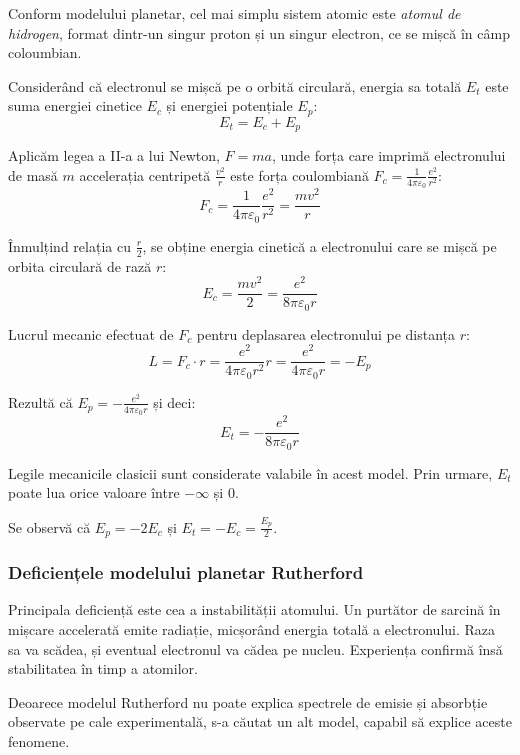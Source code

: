 Conform modelului planetar, cel mai simplu sistem atomic este
\emph{atomul de hidrogen}, format dintr-un singur proton și un singur electron,
ce se mișcă în câmp coloumbian.

Considerând că electronul se mișcă pe o orbită circulară, energia sa totală
$E_t$ este suma energiei cinetice $E_c$ și energiei potențiale $E_p$:
\[ E_t = E_c + E_p \]

Aplicăm legea a II-a a lui Newton, \( F = ma \), unde forța care imprimă
electronului de masă $m$ accelerația centripetă \( \frac{v^2}{r} \) este forța
coulombiană \( F_c = \frac{1}{4\pi\varepsilon_0} \frac{e^2}{r^2} \):
\[ F_c = \frac{1}{4\pi\varepsilon_0} \frac{e^2}{r^2} = \frac{mv^2}{r} \]

Înmulțind relația cu \( \frac{r}{2} \), se obține energia cinetică a
electronului care se mișcă pe orbita circulară de rază $r$:
\[ E_c = \frac{mv^2}{2} = \frac{e^2}{8\pi\varepsilon_0 r} \]

Lucrul mecanic efectuat de $F_c$ pentru deplasarea electronului pe distanța
$r$:
\[
    L = F_c \cdot r = \frac{e^2}{4\pi\varepsilon_0 r^2} r
    = \frac{e^2}{4\pi\varepsilon_0 r} = - E_p
\]

Rezultă că \( E_p = - \frac{e^2}{4\pi\varepsilon_0 r} \) și deci:
\begin{equation}
    E_t = - \frac{e^2}{8\pi\varepsilon_0 r}
    \label{eq:1}
\end{equation}

Legile mecanicile clasicii sunt considerate valabile în acest model. Prin urmare, $E_t$ poate lua orice valoare între $-\infty$ și 0.

Se observă că \( E_p = -2E_c \) și \( E_t = -E_c = \frac{E_p}{2} \).

\subsubsection*{Deficiențele modelului planetar Rutherford}

Principala deficiență este cea a instabilității atomului. Un purtător de sarcină în
mișcare accelerată emite radiație, micșorând energia totală a electronului.
Raza sa va scădea, și eventual electronul va cădea pe nucleu. Experiența
confirmă însă stabilitatea în timp a atomilor.

Deoarece modelul Rutherford nu poate explica spectrele de emisie și absorbție
observate pe cale experimentală, s-a căutat un alt model, capabil să explice
aceste fenomene.
